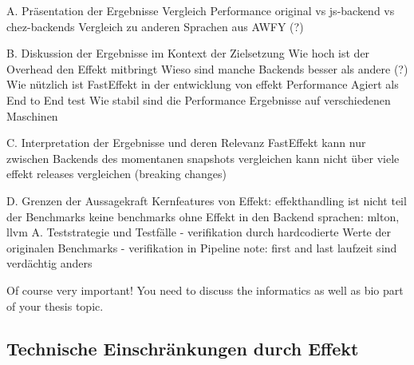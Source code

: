 		
A. Präsentation der Ergebnisse
    Vergleich Performance original vs js-backend vs chez-backends
    Vergleich zu anderen Sprachen aus AWFY (?)
    
B. Diskussion der Ergebnisse im Kontext der Zielsetzung
    Wie hoch ist der Overhead den Effekt mitbringt
    Wieso sind manche Backends besser als andere (?)
    Wie nützlich ist FastEffekt in der entwicklung von effekt
        Performance
        Agiert als End to End test
    Wie stabil sind die Performance Ergebnisse auf verschiedenen Maschinen
    
C. Interpretation der Ergebnisse und deren Relevanz
    FastEffekt kann nur zwischen Backends des momentanen snapshots vergleichen
    kann nicht über viele effekt releases vergleichen (breaking changes)

D. Grenzen der Aussagekraft
    Kernfeatures von Effekt: effekthandling ist nicht teil der Benchmarks
    keine benchmarks ohne Effekt in den Backend sprachen: mlton, llvm
    A. Teststrategie und Testfälle
        - verifikation durch hardcodierte Werte der originalen Benchmarks
        - verifikation in Pipeline	
        note: first and last laufzeit sind verdächtig anders

Of course very important! You need to discuss the informatics as well as bio part of your thesis topic.

\subsection{ Technische Einschränkungen durch Effekt }\label{sec:limitations_by_effekt}
